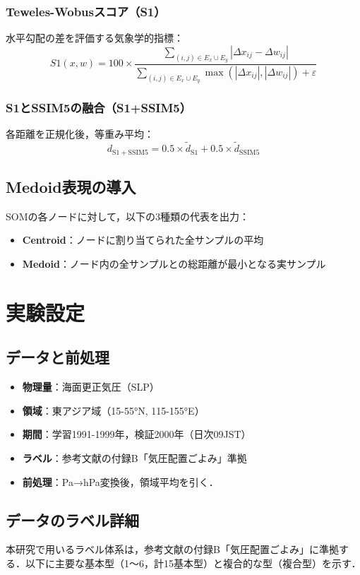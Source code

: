 \documentclass{jarticle}
\theoremstyle{definition}
\begin{document}
\subsubsection{Teweles-Wobusスコア（S1）}
水平勾配の差を評価する気象学的指標：
\begin{equation}
S1(x,w) = 100 \times \frac{\sum_{(i,j)\in E_x \cup E_y} |\Delta x_{ij} - \Delta w_{ij}|}{\sum_{(i,j)\in E_x \cup E_y} \max(|\Delta x_{ij}|, |\Delta w_{ij}|) + \varepsilon}
\end{equation}
\subsubsection{S1とSSIM5の融合（S1+SSIM5）}
各距離を正規化後，等重み平均：
\begin{equation}
d_{\mathrm{S1+SSIM5}} = 0.5 \times \tilde{d}_{\mathrm{S1}} + 0.5 \times \tilde{d}_{\mathrm{SSIM5}}
\end{equation}
\subsection{Medoid表現の導入}
SOMの各ノードに対して，以下の3種類の代表を出力：
\begin{itemize}
\item \textbf{Centroid}：ノードに割り当てられた全サンプルの平均
\item \textbf{Medoid}：ノード内の全サンプルとの総距離が最小となる実サンプル
\end{itemize}
\section{実験設定}
\subsection{データと前処理}
\begin{itemize}
\item \textbf{物理量}：海面更正気圧（SLP）
\item \textbf{領域}：東アジア域（15-55°N, 115-155°E）
\item \textbf{期間}：学習1991-1999年，検証2000年（日次09JST）
\item \textbf{ラベル}：参考文献\cite{吉野2002日本の気候}の付録B「気圧配置ごよみ」準拠
\item \textbf{前処理}：Pa→hPa変換後，領域平均を引く．
\end{itemize}
\subsection{データのラベル詳細}
本研究で用いるラベル体系は，参考文献\cite{吉野2002日本の気候}の付録B「気圧配置ごよみ」に準拠する．以下に主要な基本型（1〜6，計15基本型）と複合的な型（複合型）を示す．
\end{document}
